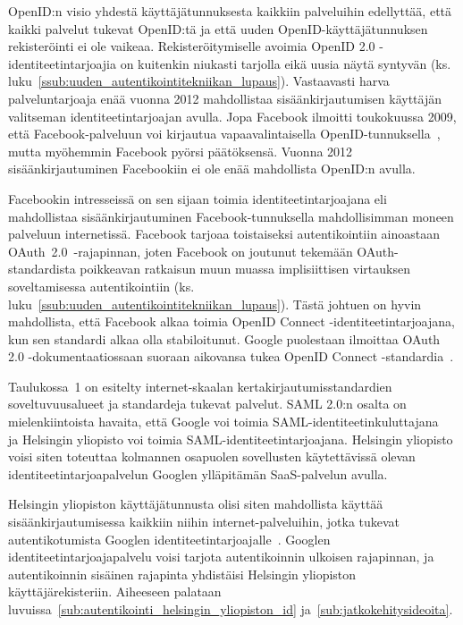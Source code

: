 \documentclass[finnish,gradu]{tktltiki}
\begin{document}

  OpenID:n visio yhdestä käyttäjätunnuksesta kaikkiin palveluihin edellyttää, että kaikki palvelut tukevat OpenID:tä ja että uuden OpenID-käyttäjätunnuksen rekisteröinti ei ole vaikeaa. Rekisteröitymiselle avoimia OpenID 2.0 -identiteetintarjoajia on kuitenkin niukasti tarjolla eikä uusia näytä syntyvän (ks. luku~\ref{ssub:uuden_autentikointitekniikan_lupaus}). Vastaavasti harva palveluntarjoaja enää vuonna 2012 mahdollistaa sisäänkirjautumisen käyttäjän valitseman identiteetintarjoajan avulla. Jopa Facebook ilmoitti toukokuussa 2009, että Facebook-palveluun voi kirjautua vapaavalintaisella OpenID-tun\-nuksel\-la~\cite{facebook_openid_idp}, mutta myöhemmin Facebook pyörsi päätöksensä. Vuonna 2012 sisäänkirjautuminen Facebookiin ei ole enää mahdollista OpenID:n avulla.

  Facebookin intresseissä on sen sijaan toimia identiteetintarjoajana eli mahdollistaa sisäänkirjautuminen Facebook-tunnuksella mahdollisimman moneen palveluun internetissä. Facebook tarjoaa toistaiseksi autentikointiin ainoastaan \mbox{OAuth 2.0 -raja}\-pinnan, joten Facebook on joutunut tekemään OAuth-standardista poikkeavan ratkaisun muun muassa implisiittisen virtauksen soveltamisessa autentikointiin (ks. luku~\ref{ssub:uuden_autentikointitekniikan_lupaus}). Tästä johtuen on hyvin mahdollista, että Facebook alkaa toimia \mbox{OpenID} Connect -identiteetintarjoajana, kun sen standardi alkaa olla stabiloitunut. Google puolestaan ilmoittaa OAuth 2.0 -dokumentaatiossaan suoraan aikovansa tukea \mbox{OpenID} Connect -standardia~\cite{google_oauth2_doc}.

  Taulukossa~1 on esitelty internet-skaalan kertakirjautumisstandardien soveltuvuusalueet ja standardeja tukevat palvelut. SAML 2.0:n osalta on mielenkiintoista havaita, että Google voi toimia SAML-identiteetinkuluttajana~\cite{google_saml_doc} ja Helsingin yliopisto voi toimia SAML-identiteetintarjoajana. Helsingin yliopisto voisi siten toteuttaa kolmannen osapuolen sovellusten käytettävissä olevan identiteetintarjoapalvelun Googlen ylläpitämän SaaS-palvelun avulla.

  Helsingin yliopiston käyttäjätunnusta olisi siten mahdollista käyttää sisäänkirjautumisessa kaikkiin niihin internet-palveluihin, jotka tukevat autentikotumista Googlen identiteetintarjoajalle~\cite{google_shibboleth_doc}. Googlen identiteetintarjoajapalvelu voisi tarjota autentikoinnin ulkoisen rajapinnan, ja autentikoinnin sisäinen rajapinta yhdistäisi Helsingin yliopiston käyttäjärekisteriin. Aiheeseen palataan luvuissa~\ref{sub:autentikointi_helsingin_yliopiston_id} ja~\ref{sub:jatkokehitysideoita}.
\end{document}
